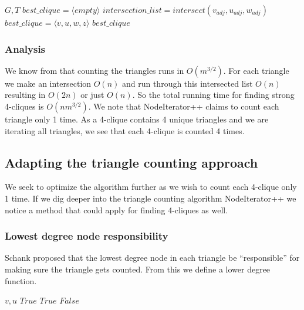 \documentclass{article}
\begin{document}
\begin{algorithm}
\caption{$strong\_4clique\_finder+$}
\begin{algorithmic}
\REQUIRE $G,T$
\STATE $best\_clique = \langle empty\rangle $
\STATE $intersection\_list = intersect(v_{adj}, u_{adj}, w_{adj})$
\STATE $best\_clique = \langle v,u,w,z\rangle $
\ENDIF
\ENDFOR
\ENDIF
\ENDFOR
\RETURN $best\_clique$
\end{algorithmic}
\end{algorithm}

\subsubsection{Analysis}
We know from \cite{countingTriangles} that counting the triangles runs in $O(m^{3/2})$. For each triangle we make an intersection $O(n)$ and run through this intersected list $O(n)$ resulting in $O(2n)$ or just $O(n)$. So the total running time for finding strong 4-cliques is $O(nm^{3/2})$. We note that NodeIterator++ claims to count each triangle only 1 time. As a 4-clique contains 4 unique triangles and we are iterating all triangles, we see that each 4-clique is counted 4 times.

\subsection{Adapting the triangle counting approach}
We seek to optimize the algorithm further as we wish to count each 4-clique only 1 time. If we dig deeper into the triangle counting algorithm NodeIterator++ \cite{countingTriangles} we notice a method that could apply for finding 4-cliques as well.

\subsubsection{Lowest degree node responsibility}
Schank \cite{AlgorithmicAspects} proposed that the lowest degree node in each triangle be “responsible” for making sure the triangle gets counted. From this we define a lower degree function.

\begin{algorithm}
\caption{$lower\_degree$}
\begin{algorithmic}
\REQUIRE $v,u$
\RETURN $True$
\RETURN $True$
\ELSE
\RETURN $False$
\ENDIF
\end{algorithmic}
\end{algorithm}
\end{document}
